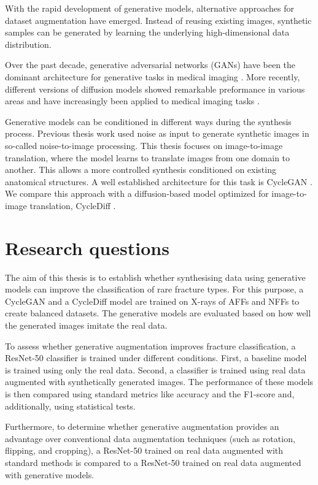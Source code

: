 With the rapid development of generative models, alternative approaches for dataset augmentation have emerged. Instead of reusing 
existing images, synthetic samples can be generated by learning the underlying high-dimensional data distribution.

Over the past decade, generative adversarial networks (GANs) have been the dominant architecture for generative tasks 
in medical imaging \cite{ali_generative_2025}. 
More recently, different versions of diffusion models showed remarkable preformance in various areas and
have increasingly been applied to medical imaging tasks \cite{shi_diffusion_2025}. 

Generative models can be conditioned in different ways during the synthesis process. Previous thesis work used noise as input to generate
synthetic images \cite{wang_synthetic_2025} in so-called noise-to-image processing. 
This thesis focuses on image-to-image translation, where the model learns to translate images from one domain to another. This allows a more 
controlled synthesis conditioned on existing anatomical structures.
A well established architecture for this task is CycleGAN \cite{zhu_unpaired_2018}. We compare this approach with a diffusion-based model 
optimized for image-to-image translation, CycleDiff \cite{zou_cyclediff_2026}.

\section{Research questions}
\label{sec:research-questions}

The aim of this thesis is to establish whether synthesising data using generative models can improve the classification of rare fracture types. 
For this purpose, a CycleGAN and a CycleDiff model are trained on X-rays of AFFs and NFFs to create balanced datasets. The generative models
are evaluated based on how well the generated images imitate the real data.

To assess whether generative augmentation improves fracture classification, a ResNet-50 classifier is trained under different conditions. 
First, a baseline model is trained using only the real data. Second, a classifier is trained using real data augmented with synthetically
generated images. The performance of these models is then compared using standard metrics like accuracy and the F1-score and, additionally, using 
statistical tests.

Furthermore, to determine whether generative augmentation provides an advantage over conventional data augmentation techniques 
(such as rotation, flipping, and cropping), a ResNet-50 trained on real data augmented with standard methods is compared to a 
ResNet-50 trained on real data augmented with generative models.


